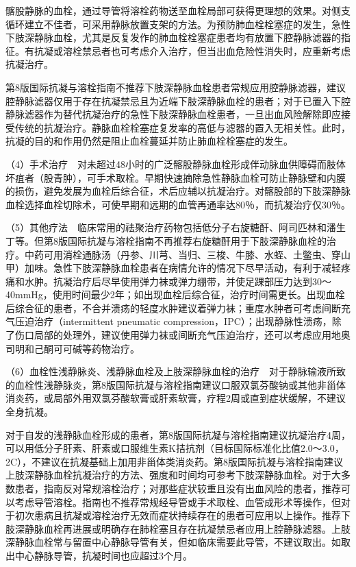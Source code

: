 髂股静脉的血栓，通过导管将溶栓药物送至血栓局部可获得更理想的效果。对侧支循环建立不佳者，可采用静脉放置支架的方法。为预防肺血栓栓塞症的发生，急性下肢深静脉血栓，尤其是反复发作的肺血栓栓塞症患者均有放置下腔静脉滤器的指征。有抗凝或溶栓禁忌者也可考虑介入治疗，但当出血危险性消失时，应重新考虑抗凝治疗。

第8版国际抗凝与溶栓指南不推荐下肢深静脉血栓患者常规应用腔静脉滤器，建议腔静脉滤器仅用于存在抗凝禁忌且为近端下肢深静脉血栓的患者；对于已置入下腔静脉滤器作为替代抗凝治疗的急性下肢深静脉血栓患者，一旦出血风险解除即应接受传统的抗凝治疗。静脉血栓栓塞症复发率的高低与滤器的置入无相关性。此时，抗凝的目的和作用仍然是阻止血栓蔓延并防止肺血栓栓塞症的发生。

（4）手术治疗　对未超过48小时的广泛髂股静脉血栓形成伴动脉血供障碍而肢体坏疽者（股青肿），可手术取栓。早期快速摘除急性静脉血栓可防止静脉壁和内膜的损伤，避免发展为血栓后综合征，术后应辅以抗凝治疗。对髂股部的下肢深静脉血栓选择血栓切除术，可使早期和远期的血管再通率达80％，而抗凝治疗仅30％。

（5）其他疗法　临床常用的祛聚治疗药物包括低分子右旋糖酐、阿司匹林和潘生丁等。但第8版国际抗凝与溶栓指南不再推荐右旋糖酐用于下肢深静脉血栓的治疗。中药可用消栓通脉汤（丹参、川芎、当归、三梭、牛膝、水蛭、土鳖虫、穿山甲）加味。急性下肢深静脉血栓患者在病情允许的情况下尽早活动，有利于减轻疼痛和水肿。抗凝治疗后尽早使用弹力袜或弹力绷带，并使足踝部压力达到30～40mmHg，使用时间最少2年；如出现血栓后综合征，治疗时间需更长。出现血栓后综合征的患者，不合并溃疡的轻度水肿建议着弹力袜；重度水肿者可考虑间断充气压迫治疗（intermittent
pneumatic
compression，IPC）；出现静脉性溃疡，除了伤口局部的处理外，建议使用弹力袜或间断充气压迫治疗，还可以考虑应用地奥司明和己酮可可碱等药物治疗。

（6）血栓性浅静脉炎、浅静脉血栓及上肢深静脉血栓的治疗　对于静脉输液所致的血栓性浅静脉炎，第8版国际抗凝与溶栓指南建议口服双氯芬酸钠或其他非甾体消炎药，或局部外用双氯芬酸软膏或肝素软膏，疗程2周或直到症状缓解，不建议全身抗凝。

对于自发的浅静脉血栓形成的患者，第8版国际抗凝与溶栓指南建议抗凝治疗4周，可以用低分子肝素、肝素或口服维生素K拮抗剂（目标国际标准化比值2.0～3.0，2C），不建议在抗凝基础上加用非甾体类消炎药。第8版国际抗凝与溶栓指南建议上肢深静脉血栓抗凝治疗的方法、强度和时间均可参考下肢深静脉血栓。对于大多数患者，指南反对常规溶栓治疗；对那些症状较重且没有出血风险的患者，推荐可以考虑导管溶栓。指南也不推荐常规经导管或手术取栓、血管成形术等操作，但对于初次患病且抗凝或溶栓治疗无效而症状持续存在的患者可应用以上操作。推荐下肢深静脉血栓再进展或明确存在肺栓塞且存在抗凝禁忌者应用上腔静脉滤器。上肢深静脉血栓常与留置中心静脉导管有关，但如临床需要此导管，不建议取出。如取出中心静脉导管，抗凝时间也应超过3个月。

